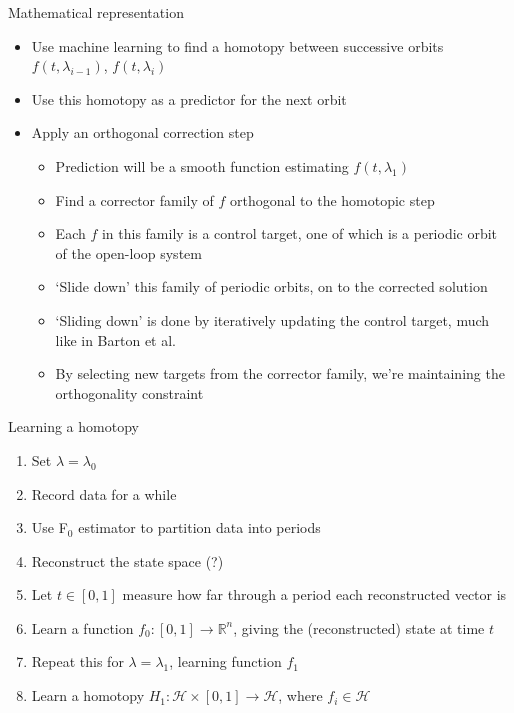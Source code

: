 \documentclass[presentation]{beamer}
\begin{document}
\begin{frame}[label={sec:org373f040}]{Mathematical representation}
\begin{itemize}
\item Use machine learning to find a homotopy between successive orbits \(f(t, \lambda_{i-1})\), \(f(t, \lambda_i)\)
\item Use this homotopy as a predictor for the next orbit
\item Apply an orthogonal correction step
\begin{itemize}
\item Prediction will be a smooth function estimating \(f(t, \lambda_1)\)
\item Find a corrector family of \(f\) orthogonal to the homotopic step
\item Each \(f\) in this family is a control target, one of which is a periodic orbit of the open-loop system
\item `Slide down' this family of periodic orbits, on to the corrected solution
\item `Sliding down' is done by iteratively updating the control target, much like in Barton et al.
\item By selecting new targets from the corrector family, we're maintaining the orthogonality constraint
\end{itemize}
\end{itemize}
\end{frame}

\begin{frame}[label={sec:org87db716}]{Learning a homotopy}
\begin{enumerate}
\item Set \(\lambda = \lambda_0\)
\item Record data for a while
\item Use F\(_{\text{0}}\) estimator to partition data into periods
\item Reconstruct the state space (?)
\item Let \(t \in [0,1]\) measure how far through a period each reconstructed vector is
\item Learn a function \(f_0: [0,1] \to \mathbb{R}^n\), giving the (reconstructed) state at time \(t\)
\item Repeat this for \(\lambda = \lambda_1\), learning function \(f_1\)
\item Learn a homotopy \(H_1: \mathcal{H}\times [0,1] \to \mathcal{H}\), where \(f_i \in \mathcal{H}\)
\end{enumerate}
\end{frame}
\end{document}
